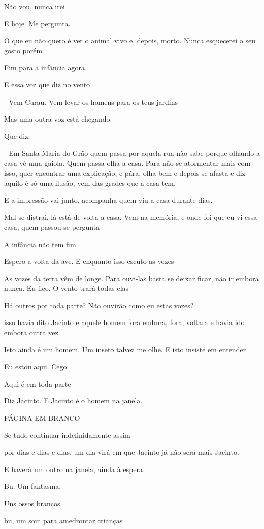 Não vou, nunca irei

E hoje. Me pergunta.

O que eu não quero é ver o animal vivo e, depois, morto. Nunca
esquecerei o seu gosto porém

Fim para a infância agora.

E essa voz que diz no vento

- Vem Curau. Vem levar os homens para os teus jardins

Mas uma outra voz está chegando.

Que diz:

- Em Santa Maria do Grão quem passa por aquela rua não sabe porque
olhando a casa vê uma gaiola. Quem passa olha a casa. Para não se
atormentar mais com isso, quer encontrar uma explicação, e pára, olha
bem e depois se afasta e diz aquilo é só uma ilusão, vem das grades que
a casa tem.

E a impressão vai junto, acompanha quem viu a casa durante dias.

Mal se distrai, lá está de volta a casa. Vem na memória, e onde foi que
eu vi essa casa, quem passou se pergunta

A infância não tem fim

Espero a volta da ave. E enquanto isso escuto as vozes

As vozes da terra vêm de longe. Para ouvi-las basta se deixar ficar, não
ir embora nunca. Eu fico. O vento trará todas elas

Há outros por toda parte? Não ouvirão como eu estas vozes?

isso havia dito Jacinto e aquele homem fora embora, fora, voltara e
havia ido embora outra vez.

Isto ainda é um homem. Um inseto talvez me olhe. E isto insiste em
entender

Eu estou aqui. Cego.

Aqui é em toda parte

Diz Jacinto. E Jacinto é o homem na janela.

PÁGINA EM BRANCO

Se tudo continuar indefinidamente assim

por dias e dias e dias, um dia virá em que Jacinto já não será mais
Jacinto.

E haverá um outro na janela, ainda à espera

Bu. Um fantasma.

Uns ossos brancos

bu, um som para amedrontar crianças

